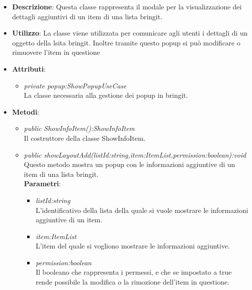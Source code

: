 \begin{itemize}
\item \textbf{Descrizione}: Questa classe rappresenta il modale per la visualizzazione dei dettagli aggiuntivi di un item di una lista bringit.
\item \textbf{Utilizzo}: La classe viene utilizzata per comunicare agli utenti i dettagli di un oggetto della lsita bringit. Inoltre tramite questo popup si può modificare o rimuovere l'item in questione
\item \textbf{Attributi}: 
	\begin{itemize}
	\item \textit{private popup:ShowPopupUseCase}\\
	La classe necessaria alla gestione dei popup in bringit.
	\end{itemize}
\item \textbf{Metodi}:
	\begin{itemize}
	\item \textit{public ShowInfoItem():ShowInfoItem}\\
	Il costruttore della classe ShowInfoItem.
		\item \textit{public showLayoutAdd(listId:string,item:ItemList,permission:boolean):void}\\
		Questo metodo mostra un popup con le informazioni aggiuntive di un item di una lista bringit.
					\\ \textbf{Parametri}: \begin{itemize}
			\item \textit{listId:string}\\
			L'identificativo della lista della quale si vuole mostrare le informazioni aggiuntive di un item.
			\item \textit{item:ItemList}\\
			L'item del quale si vogliono mostrare le informazioni aggiuntive.
			\item \textit{permission:boolean}\\
			Il booleano che rappresenta i permessi, e che se impostato a true rende possibile la modifica o la rimozione dell'item in questione.
					\end{itemize} 
	\end{itemize}
\end{itemize}